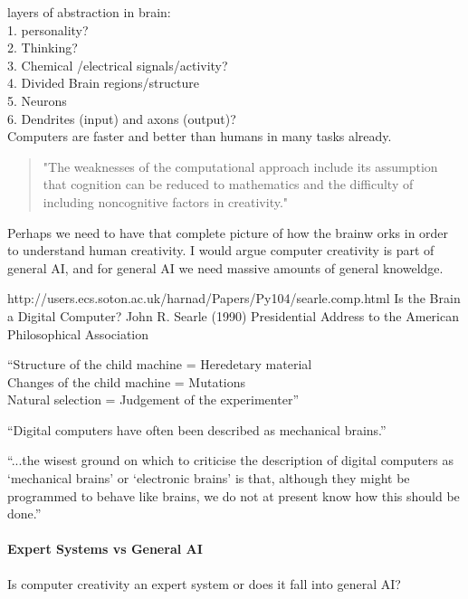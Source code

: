 \documentclass[11pt]{thesis} %
\begin{document}
layers of abstraction in brain:\\
1.	personality?\\
2.	Thinking?\\
3.	Chemical /electrical signals/activity?\\
4.	Divided Brain regions/structure\\
5.	Neurons\\
6.	Dendrites (input) and axons (output)?\\


Computers are faster and better than humans in many tasks already.

\begin{quote}
"The weaknesses of the computational approach include its assumption that cognition can be reduced to mathematics and the difficulty of including noncognitive factors in creativity." \autocite[p.457]{Mayer1999}
\end{quote}


Perhaps we need to have that complete picture of how the brainw orks in order to understand human creativity. I would argue computer creativity is part of general \ac{AI}, and for general \ac{AI} we need massive amounts of general knoweldge.


http://users.ecs.soton.ac.uk/harnad/Papers/Py104/searle.comp.html
Is the Brain a Digital Computer? John R. Searle
(1990) Presidential Address to the American Philosophical Association
\autocite{Searle1990}

``Structure of the child machine = Heredetary material\\
Changes of the child machine = Mutations\\
Natural selection = Judgement of the experimenter''\autocite{Turing2009} 

``Digital computers have often been described as mechanical brains.''\autocite{Turing1951} 


``...the wisest ground on which to criticise the description of digital computers as `mechanical brains' or `electronic brains' is that, although they might be programmed to behave like brains, we do not at present know how this should be done.''\autocite{Turing1951} 


\paragraph{Expert Systems vs General AI}
Is computer creativity an expert system or does it fall into general \ac{AI}? 
\end{document}
